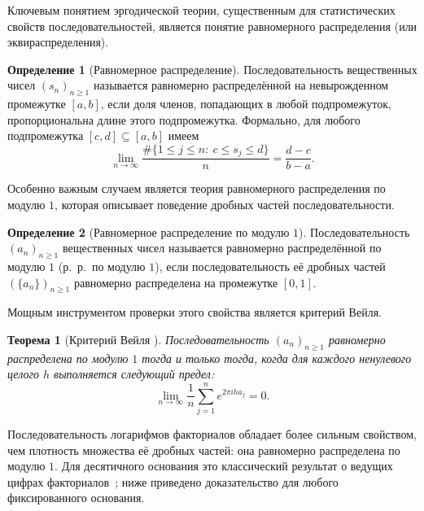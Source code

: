 \documentclass[a4paper,14pt]{extreport}
\theoremstyle{plain}
\newtheorem{theorem}{Теорема}[section]
\theoremstyle{definition}
\newtheorem{definition}{Определение}[section]
\theoremstyle{remark}
\begin{document}
Ключевым понятием эргодической теории, существенным для статистических свойств последовательностей, является понятие равномерного распределения (или эквираспределения).

\begin{definition}[Равномерное распределение]
	Последовательность вещественных чисел $(s_{n})_{n \geq 1}$ называется равномерно распределённой на невырожденном промежутке $[a,b]$, если доля членов, попадающих в любой подпромежуток, пропорциональна длине этого подпромежутка. Формально, для любого подпромежутка $[c,d] \subseteq [a,b]$ имеем
	\begin{equation}
		\lim_{n \to \infty} \frac{\#\{1\le j\le n:\ c\le s_j\le d\}}{n}
		= \frac{d-c}{b-a}.
	\end{equation}
\end{definition}

Особенно важным случаем является теория равномерного распределения по модулю $1$, которая описывает поведение дробных частей последовательности. 

\begin{definition}[Равномерное распределение по модулю $1$]
	Последовательность $(a_n)_{n \geq 1}$ вещественных чисел называется равномерно распределённой по модулю $1$ (р.~р.\ по модулю $1$), если последовательность её дробных частей $(\{a_n\})_{n \geq 1}$ равномерно распределена на промежутке $[0,1]$.
\end{definition}

Мощным инструментом проверки этого свойства является критерий Вейля.

\begin{theorem}[Критерий Вейля {\cite{Kuipers}}]
	Последовательность $(a_n)_{n \geq 1}$ равномерно распределена по модулю $1$ тогда и только тогда, когда для каждого ненулевого целого $h$ выполняется следующий предел:
	\begin{equation}
		\lim_{n \to \infty} \frac{1}{n} \sum_{j=1}^{n} e^{2 \pi i h a_{j}} = 0.
	\end{equation}
\end{theorem}

Последовательность логарифмов факториалов обладает более сильным
свойством, чем плотность множества её дробных частей: она равномерно
распределена по модулю $1$. Для десятичного основания это классический
результат о ведущих цифрах факториалов~\cite{Diaconis1977};
ниже приведено доказательство для любого фиксированного основания.
\end{document}
